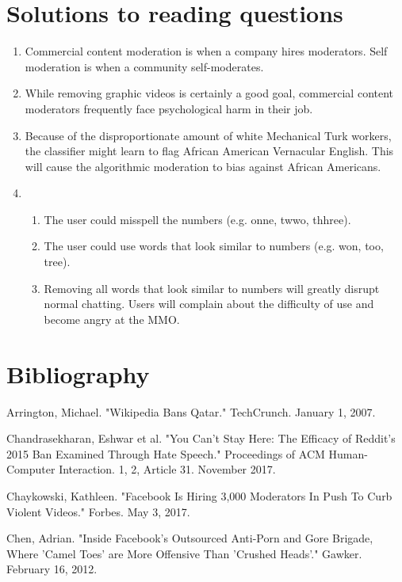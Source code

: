 \documentclass[class=book, crop=false]{standalone}
\begin{document}
\section{Solutions to reading questions}
\begin{enumerate}
    \item Commercial content moderation is when a company hires moderators. Self moderation is when a community self-moderates.
    
    \item While removing graphic videos is certainly a good goal, commercial content moderators frequently face psychological harm in their job.
    
    \item Because of the disproportionate amount of white Mechanical Turk workers, the classifier might learn to flag African American Vernacular English. This will cause the algorithmic moderation to bias against African Americans.
    
    \item \begin{enumerate}
        \item The user could misspell the numbers (e.g. onne, twwo, thhree).
        \item The user could use words that look similar to numbers (e.g. won, too, tree).
        \item Removing all words that look similar to numbers will greatly disrupt normal chatting. Users will complain about the difficulty of use and become angry at the MMO.
    \end{enumerate}
\end{enumerate}

\section{Bibliography}

Arrington, Michael. "Wikipedia Bans Qatar." TechCrunch. January 1, 2007.

Chandrasekharan, Eshwar et al. "You Can't Stay Here: The Efficacy of Reddit's 2015 Ban Examined Through Hate Speech." Proceedings of ACM Human-Computer Interaction. 1, 2, Article 31. November 2017.

Chaykowski, Kathleen. "Facebook Is Hiring 3,000 Moderators In Push To Curb Violent Videos." Forbes. May 3, 2017.

Chen, Adrian. "Inside Facebook's Outsourced Anti-Porn and Gore Brigade, Where 'Camel Toes' are More Offensive Than 'Crushed Heads'." Gawker. February 16, 2012.
\end{document}
